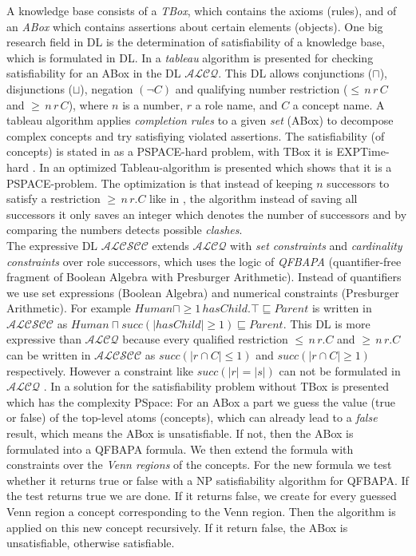 \documentclass{book}
\theoremstyle{break}
\theoremstyle{definition}
\begin{document}
A knowledge base consists of a \textit{TBox}, which contains the axioms (rules), and of an \textit{ABox} which contains assertions about certain elements (objects). One big research field in DL is the determination of satisfiability of a knowledge base, which is formulated in DL.  In \cite{1} a \textit{tableau} algorithm is presented for checking satisfiability for an ABox in the DL $\mathcal{ALCQ}$. This DL allows conjunctions ($\sqcap$), disjunctions ($\sqcup$), negation $(\neg C)$ and qualifying number restriction ($\leq\,n\,r\, C$ and $\geq \, n\, r\, C$), where $n$ is a number, $r$ a role name, and $C$ a concept name. A tableau algorithm applies \textit{completion rules} to a given \textit{set} (ABox) to decompose complex concepts and try satisfiying violated assertions. The satisfiability (of concepts) is stated in \cite{1} as a PSPACE-hard problem, with TBox it is EXPTime-hard \cite{4}. In \cite{pspace} an optimized Tableau-algorithm is presented which shows that it is a PSPACE-problem. The optimization is that instead of keeping $n$ successors to satisfy a restriction $\geq\,n\,r.C$ like in \cite{1}, the algorithm instead of saving all successors it only saves an integer which denotes the number of successors and by comparing the numbers detects possible \textit{clashes}.\\
The expressive DL $\mathcal{ALCSCC}$ \cite{4} extends $\mathcal{ALCQ}$ with \textit{set constraints} and \textit{cardinality constraints} over role successors, which uses the logic of \textit{QFBAPA} \cite{KuncakRinard} (quantifier-free fragment of Boolean Algebra with Presburger Arithmetic). Instead of quantifiers we use set expressions (Boolean Algebra) and numerical constraints (Presburger Arithmetic). For example $Human \sqcap \geq 1\,hasChild.\top\sqsubseteq Parent$ is written in $\mathcal{ALCSCC}$ as $Human\sqcap succ(|hasChild|\geq 1)\sqsubseteq Parent$. This DL is more expressive than $\mathcal{ALCQ}$ because every qualified restriction $\leq\,n\,r.C$ and $\geq \, n\, r.C$ can be written in $\mathcal{ALCSCC}$ as $succ(|r\cap C|\leq 1)$ and $succ(|r\cap C|\geq 1)$ respectively. However a constraint like $succ(|r|=|s|)$ can not be formulated in $\mathcal{ALCQ}$ \cite{4}. In \cite{4} a solution for the satisfiability problem without TBox is presented which has the complexity PSpace: For an ABox a part we guess the value (true or false) of the top-level atoms (concepts), which can already lead to a \textit{false} result, which means the ABox is unsatisfiable. If not, then the ABox is formulated into a QFBAPA formula. We then extend the formula with constraints over the \textit{Venn regions} of the concepts. For the new formula we test whether it returns true or false with a NP satisfiability algorithm for QFBAPA. If the test returns true we are done. If it returns false, we create for every guessed Venn region a concept corresponding to the Venn region. Then the algorithm is applied on this new concept recursively. If it return false, the ABox is unsatisfiable, otherwise satisfiable.\\
\end{document}
